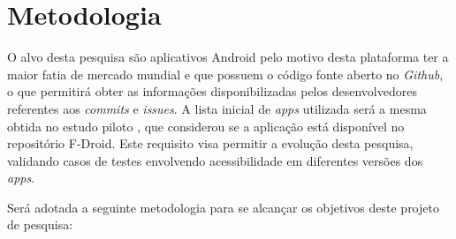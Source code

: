 \section{Metodologia}
O alvo desta pesquisa são aplicativos Android pelo motivo desta plataforma ter a maior fatia de mercado mundial \cite{ihc2019} e que possuem o código fonte aberto no \textit{Github}, o que permitirá obter as informações disponibilizadas pelos desenvolvedores referentes aos \textit{commits} e \textit{issues}. A lista inicial de \textit{apps} utilizada será a mesma obtida no estudo piloto \cite{ihc2019}, que considerou se a aplicação está disponível no repositório F-Droid. Este requisito visa permitir a evolução desta pesquisa, validando casos de testes envolvendo acessibilidade em diferentes versões dos \textit{apps}.

Será adotada a seguinte metodologia para se alcançar os objetivos deste projeto de pesquisa:

